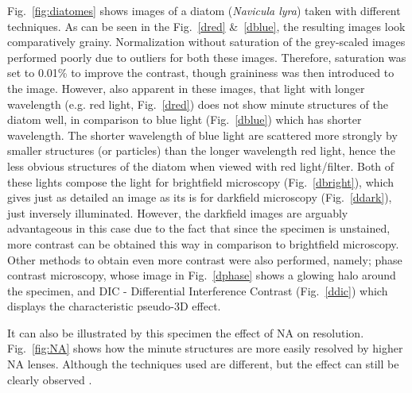 Fig.~\ref{fig:diatomes} shows images of a diatom (\textit{Navicula lyra}) taken with different techniques. 
As can be seen in the Fig.~\ref{dred} \&~\ref{dblue}, the resulting images look comparatively grainy. 
Normalization without saturation of the grey-scaled images performed poorly due to outliers for both these images. 
Therefore, saturation was set to 0.01\% to improve the contrast, though graininess was then introduced to the image. 
However, also apparent in these images, that light with longer wavelength (e.g. red light, Fig.~\ref{dred}) does not show minute structures of the diatom well, in comparison to blue light (Fig.~\ref{dblue}) which has shorter wavelength. 
The shorter wavelength of blue light are scattered more strongly by smaller structures (or particles) than the longer wavelength red light, hence the less obvious structures of the diatom when viewed with red light/filter. 
Both of these lights compose the light for brightfield microscopy (Fig.~\ref{dbright}), which gives just as detailed an image as its is for darkfield microscopy (Fig.~\ref{ddark}), just inversely illuminated. 
However, the darkfield images are arguably advantageous in this case due to the fact that since the specimen is unstained, more contrast can be obtained this way in comparison to brightfield microscopy. 
Other methods to obtain even more contrast were also performed, namely; phase contrast microscopy, whose image in Fig.~\ref{dphase} shows a glowing halo around the specimen, and DIC - Differential Interference Contrast (Fig.~\ref{ddic}) which displays the characteristic pseudo-3D effect.

It can also be illustrated by this specimen the effect of NA on resolution. 
Fig.~\ref{fig:NA} shows how the minute structures are more easily resolved by higher NA lenses. 
Although the techniques used are different, but the effect can still be clearly observed \cite{North2006}.

